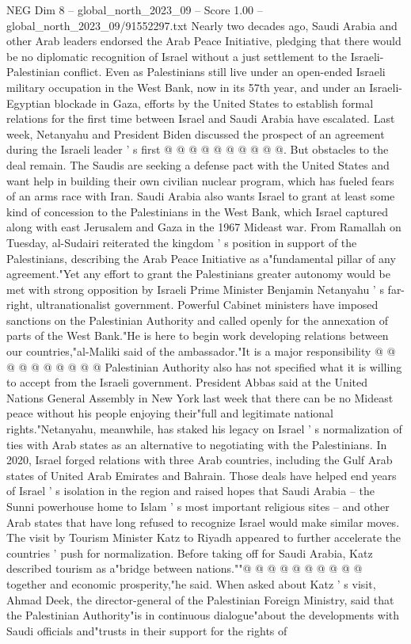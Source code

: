 \begin{textsample}{NEG Dim 8 – global\_north\_2023\_09 – Score 1.00 – global\_north\_2023\_09/91552297.txt}
Nearly two decades ago, Saudi Arabia and other Arab leaders endorsed the Arab Peace Initiative, pledging that there would be no diplomatic recognition of Israel without a just settlement to the Israeli-Palestinian conflict.
Even as Palestinians still live under an open-ended Israeli military occupation in the West Bank, now in its 57th year, and under an Israeli-Egyptian blockade in Gaza, efforts by the United States to establish formal relations for the first time between Israel and Saudi Arabia have escalated.
Last week, Netanyahu and President Biden discussed the prospect of an agreement during the Israeli leader ' s first @ @ @ @ @ @ @ @ @ @.
But obstacles to the deal remain.
The Saudis are seeking a defense pact with the United States and want help in building their own civilian nuclear program, which has fueled fears of an arms race with Iran.
Saudi Arabia also wants Israel to grant at least some kind of concession to the Palestinians in the West Bank, which Israel captured along with east Jerusalem and Gaza in the 1967 Mideast war.
From Ramallah on Tuesday, al-Sudairi reiterated the kingdom ' s position in support of the Palestinians, describing the Arab Peace Initiative as a"fundamental pillar of any agreement."Yet any effort to grant the Palestinians greater autonomy would be met with strong opposition by Israeli Prime Minister Benjamin Netanyahu ' s far-right, ultranationalist government.
Powerful Cabinet ministers have imposed sanctions on the Palestinian Authority and called openly for the annexation of parts of the West Bank."He is here to begin work developing relations between our countries,"al-Maliki said of the ambassador."It is a major responsibility @ @ @ @ @ @ @ @ @ @ Palestinian Authority also has not specified what it is willing to accept from the Israeli government.
President Abbas said at the United Nations General Assembly in New York last week that there can be no Mideast peace without his people enjoying their"full and legitimate national rights."Netanyahu, meanwhile, has staked his legacy on Israel ' s normalization of ties with Arab states as an alternative to negotiating with the Palestinians.
In 2020, Israel forged relations with three Arab countries, including the Gulf Arab states of United Arab Emirates and Bahrain.
Those deals have helped end years of Israel ' s isolation in the region and raised hopes that Saudi Arabia -- the Sunni powerhouse home to Islam ' s most important religious sites -- and other Arab states that have long refused to recognize Israel would make similar moves.
The visit by Tourism Minister Katz to Riyadh appeared to further accelerate the countries ' push for normalization.
Before taking off for Saudi Arabia, Katz described tourism as a"bridge between nations.""@ @ @ @ @ @ @ @ @ @ together and economic prosperity,"he said.
When asked about Katz ' s visit, Ahmad Deek, the director-general of the Palestinian Foreign Ministry, said that the Palestinian Authority"is in continuous dialogue"about the developments with Saudi officials and"trusts in their support for the rights of

\end{textsample}
